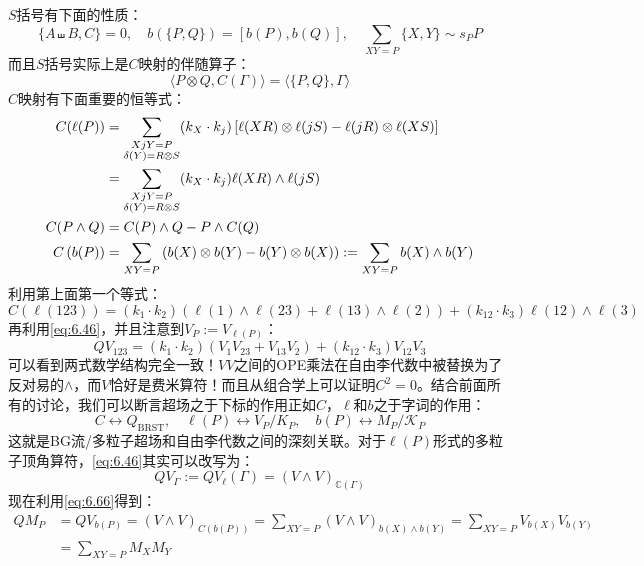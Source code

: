 $S$括号有下面的性质：
\begin{equation}
	\label{eq:6.62}
	\{A\shuffle B,C\}=0,\quad b(\{P,Q\})=[b(P),b(Q)],\quad \sum_{XY=P}\{X,Y\}\sim s_PP
\end{equation}
而且$S$括号实际上是$C$映射的伴随算子：
\begin{equation}
	\langle P\otimes Q,C(\Gamma)\rangle=\langle\{P,Q\},\Gamma\rangle
\end{equation}
$C$映射有下面重要的恒等式：
\begin{align}
	C(\ell(P))&=\sum_{\substack{XjY=P\\\delta(Y)=R\otimes S}}(k_X\cdot k_j)\left[\ell(XR)\otimes\ell(jS)-\ell(jR)\otimes\ell(XS)\right]\notag\\
	&=\sum_{\substack{XjY=P\\\delta(Y)=R\otimes S}}(k_X\cdot k_j)\ell(XR)\wedge\ell(jS)\\
	C(P\wedge Q)&=C(P)\wedge Q-P\wedge C(Q)\\
	\label{eq:6.66}
	C\left(b(P)\right)&=\sum_{XY=P}\left(b(X)\otimes b(Y)-b(Y)\otimes b(X)\right):=\sum_{XY=P}b(X)\wedge b(Y)
\end{align}
利用第上面第一个等式：
\begin{equation}
	C(\ell(123))=(k_1\cdot k_2)\left(\ell(1)\wedge\ell(23)+\ell(13)\wedge\ell(2)\right)+(k_{12}\cdot k_3)\ell(12)\wedge\ell(3)
\end{equation}
再利用\ref{eq:6.46}，并且注意到$V_P:=V_{\ell(P)}$：
\begin{equation}
	QV_{123}=(k_1\cdot k_2)\left(V_1V_{23}+V_{13}V_2\right)+(k_{12}\cdot k_3)V_{12}V_3
\end{equation}
可以看到两式数学结构完全一致！$VV$之间的OPE乘法在自由李代数中被替换为了反对易的$\wedge$，而$V$恰好是费米算符！而且从组合学上可以证明$C^2=0$。结合前面所有的讨论，我们可以断言超场之于下标的作用正如$C$，$\ell$和$b$之于字词的作用：
\begin{equation}
	\label{eq:6.69}
	\boxed{
		C\leftrightarrow Q_{\mathrm{BRST}},\quad\ell(P)\leftrightarrow V_P/K_P,\quad b(P)\leftrightarrow M_P/\mathcal{K}_P
	}
\end{equation}
这就是BG流/多粒子超场和自由李代数之间的深刻关联。对于$\ell(P)$形式的多粒子顶角算符，\ref{eq:6.46}其实可以改写为：
\begin{equation}
	QV_\Gamma:=QV_\ell(\Gamma)=(V\wedge V)_{\mathbb{C}(\Gamma)}
\end{equation}
现在利用\ref{eq:6.66}得到：
\begin{equation}
	\label{eq:6.71}
\begin{aligned}
		QM_P&=QV_{b(P)}=(V\wedge V)_{C(b(P))}=\sum_{XY=P}(V\wedge V)_{b(X)\wedge b(Y)}=\sum_{XY=P}V_{b(X)}V_{b(Y)}\\
	&=\sum_{XY=P}M_XM_Y
\end{aligned}
\end{equation}
